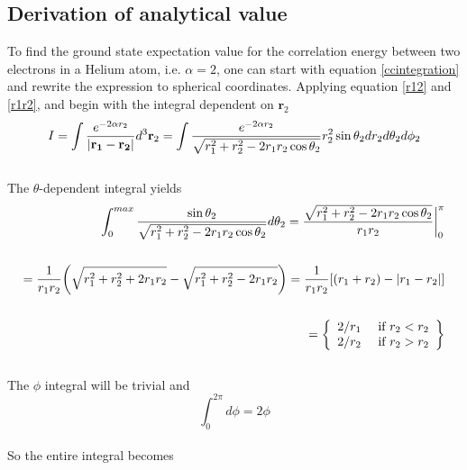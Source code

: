\documentclass[%
reprint,nofootinbib,
amsmath,amssymb,
aps,
]{revtex4-1}
\begin{document}
\subsection{Derivation of analytical value}\noindent 
To find the ground state expectation value for the correlation energy between two electrons in a Helium atom, i.e. $\alpha = 2$, one can start with equation \ref{ccintegration} and rewrite the expression to spherical coordinates. Applying equation \ref{r12} and \ref{r1r2}, and begin with the integral dependent on $\mathbf{r}_2$ \vspace{2mm}\\ 
\begin{equation*}
	I = \int \dfrac{e^{-2\alpha r_2}}{\abs{\mathbf{r_1}-\mathbf{r_2}}}d^3\mathbf{r}_2 = \int \dfrac{e^{-2\alpha r_2}}{\sqrt{r_1^2+r_2^2-2r_1r_2\cos\theta_2}}r_2^2\sin\theta_2dr_2d\theta_2d\phi_2 
\end{equation*}\vspace{2mm}\\ 
The $\theta$-dependent integral yields\vspace{2mm}\\ 
\begin{align*}
	\int_{0}^{max}\dfrac{\sin\theta_2}{\sqrt{r_1^2+r_2^2-2r_1r_2\cos\theta_2}}d\theta_2 = \dfrac{\sqrt{r_1^2+r_2^2-2r_1r_2\cos\theta_2}}{r_1r_2} \bigg|_0^\pi \\ \\ 
	= \dfrac{1}{r_1r_2}\qty(\sqrt{r_1^2+r_2^2 + 2r_1r_2} - \sqrt{r_1^2+r_2^2 -2r_1r_2})
	= \dfrac{1}{r_1r_2}\qty[(r_1+r_2)-\abs{r_1-r_2}]\\ \\
	= 	 \left\{
	\begin{array}{ll}
	2/r_1 & \textnormal{ if } r_2 < r_2\\
	2/r_2 & \textnormal{ if } r_2 > r_2
	\end{array} \right\} \\ 
\end{align*}\vspace{2mm}\\ 
The $\phi$ integral will be trivial and\vspace{2mm}\\ 
\begin{equation*}
	\int_{0}^{2\pi}d\phi = 2\phi
\end{equation*}\vspace{2mm}\\ 
So the entire integral becomes \vspace{2mm}\\ 
\end{document}
